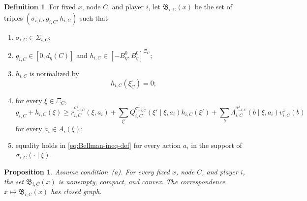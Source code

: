 \documentclass[12pt]{article}
\newtheorem{proposition}[theorem]{Proposition}
\theoremstyle{definition}
\newtheorem{definition}[theorem]{Definition}
\newcommand{\1}{\mathbf{1}}
\begin{document}
\begin{definition}
\label{def:local-BR-set}
For fixed $x$, node $C$, and player $i$, let $\mathfrak B_{i,C}(x)$ be the set of
triples $(\sigma_{i,C},g_{i,C},h_{i,C})$ such that
\begin{enumerate}[label=\textnormal{(BR\arabic*)},leftmargin=2.9em]
\item $\sigma_{i,C}\in \Sigma_{i,C}$;
\item $g_{i,C}\in[0,d_\eta(C)]$ and
$h_{i,C}\in[-B_\eta^0,B_\eta^0]^{\Xi_C}$;
\item $h_{i,C}$ is normalized by
\[
h_{i,C}(\xi_C^\circ)=0;
\]
\item for every $\xi\in\Xi_C$,
\begin{equation}
\label{eq:Bellman-ineq-def}
g_{i,C}+h_{i,C}(\xi)
\ge
r_{i,C}^{\sigma_{-i,C}^x}(\xi,a_i)
+
\sum_{\xi'}Q_{i,C}^{\sigma_{-i,C}^x}(\xi'\mid\xi,a_i)h_{i,C}(\xi')
+
\sum_b \Lambda_{i,C}^{\sigma_{-i,C}^x}(b\mid\xi,a_i)v_{i,C}^x(b)
\end{equation}
for every $a_i\in A_i(\xi)$;
\item equality holds in \eqref{eq:Bellman-ineq-def} for every action $a_i$ in the
support of $\sigma_{i,C}(\cdot\mid\xi)$.
\end{enumerate}
\end{definition}

\begin{proposition}
\label{prop:local-BR}
Assume condition~\textnormal{(a)}. For every fixed $x$, node $C$, and player $i$,
the set $\mathfrak B_{i,C}(x)$ is nonempty, compact, and convex. The
correspondence $x\mapsto \mathfrak B_{i,C}(x)$ has closed graph.
\end{proposition}
\end{document}
